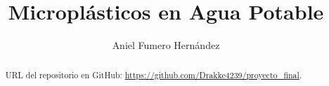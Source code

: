 \documentclass[a4paper,11pt]{article}
\title{Microplásticos en Agua Potable}
\author{Aniel Fumero Hernández}
\begin{document}
\maketitle
	\begin{abstract}
	URL del repositorio en GitHub:  \href{https://github.com/Drakke4239/proyecto\_final}{https://github.com/Drakke4239/proyecto\_final}.\\
	
	\end{abstract}
\end{document}
